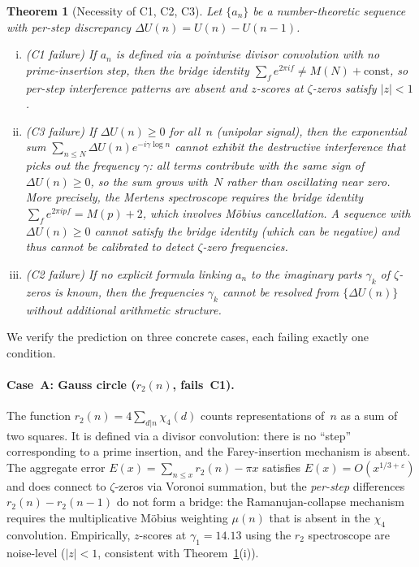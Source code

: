 \documentclass[11pt]{article}
\newtheorem{theorem}{Theorem}[section]
\theoremstyle{definition}
\begin{document}
\begin{theorem}[Necessity of C1, C2, C3]\label{thm:necessity}
Let $\{a_n\}$ be a number-theoretic sequence with per-step discrepancy
$\Delta U(n) = U(n) - U(n-1)$.
\begin{enumerate}[(i)]
\item \emph{(C1 failure)} If $a_n$ is defined via a pointwise divisor
  convolution with no prime-insertion step, then the bridge identity
  $\sum_f e^{2\pi i f} \ne M(N) + \text{const}$, so per-step
  interference patterns are absent and $z$-scores at $\zeta$-zeros
  satisfy $|z| < 1$.
\item \emph{(C3 failure)} If $\Delta U(n) \ge 0$ for all~$n$
  (unipolar signal), then the exponential sum $\sum_{n \le N} \Delta U(n)
  e^{-i\gamma \log n}$ cannot exhibit the destructive interference
  that picks out the frequency $\gamma$: all terms contribute with
  the same sign of $\Delta U(n) \ge 0$, so the sum grows with~$N$
  rather than oscillating near zero.  More precisely, the Mertens
  spectroscope requires the bridge identity $\sum_f e^{2\pi ipf}
  = M(p) + 2$, which involves Möbius cancellation.  A sequence
  with $\Delta U(n) \ge 0$ cannot satisfy the bridge identity
  (which can be negative) and thus cannot be calibrated to
  detect $\zeta$-zero frequencies.
\item \emph{(C2 failure)} If no explicit formula linking $a_n$
  to the imaginary parts $\gamma_k$ of $\zeta$-zeros is known,
  then the frequencies $\gamma_k$ cannot be resolved from
  $\{\Delta U(n)\}$ without additional arithmetic structure.
\end{enumerate}
\end{theorem}

We verify the prediction on three concrete cases, each failing
exactly one condition.

\paragraph{Case~A: Gauss circle ($r_2(n)$, fails~C1).}
The function $r_2(n) = 4\sum_{d|n}\chi_4(d)$ counts
representations of~$n$ as a sum of two squares.  It is defined
via a divisor convolution: there is no ``step'' corresponding
to a prime insertion, and the Farey-insertion mechanism is absent.
The aggregate error $E(x) = \sum_{n \le x} r_2(n) - \pi x$
satisfies $E(x) = O(x^{1/3+\varepsilon})$ and does connect to
$\zeta$-zeros via Voronoi summation, but the \emph{per-step}
differences $r_2(n) - r_2(n-1)$ do not form a bridge: the
Ramanujan-collapse mechanism requires the multiplicative Möbius
weighting $\mu(n)$ that is absent in the $\chi_4$ convolution.
Empirically, $z$-scores at $\gamma_1 = 14.13$ using the $r_2$
spectroscope are noise-level ($|z| < 1$, consistent with
Theorem~\ref{thm:necessity}(i)).
\end{document}
